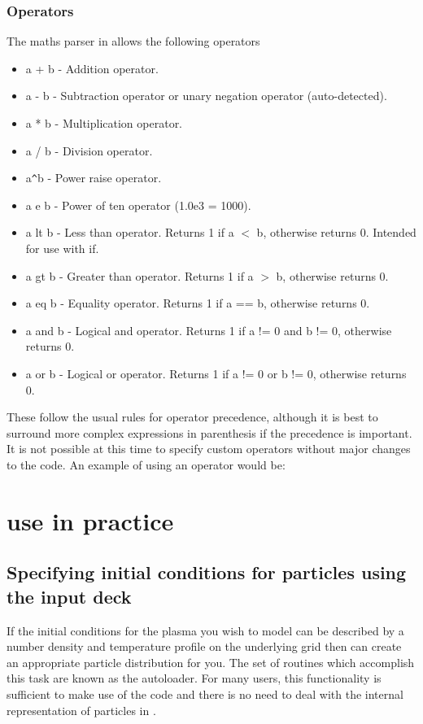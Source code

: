 \subsubsection{Operators}
The maths parser in {\EPOCH} allows the following operators
\begin{itemize}
\item a + b - Addition operator.
\item a - b - Subtraction operator or unary negation operator (auto-detected).
\item a * b - Multiplication operator.
\item a / b - Division operator.
\item a\verb|^|b - Power raise operator.
\item a e b - Power of ten operator (1.0e3 = 1000).
\item a lt b - Less than operator. Returns 1 if a $<$ b, otherwise returns
  0. Intended for use with if.
\item a gt b - Greater than operator. Returns 1 if a $>$ b, otherwise returns 0.
\item a eq b - Equality operator. Returns 1 if a == b, otherwise returns 0.
\item a and b - Logical and operator. Returns 1 if a != 0 and b != 0,
  otherwise returns 0.
\item a or b - Logical or operator. Returns 1 if a != 0 or b != 0, otherwise
  returns 0.
\end{itemize}

These follow the usual rules for operator precedence, although it is best
to surround more complex expressions in parenthesis if the precedence
is important.
It is not possible at this time to specify custom operators without major
changes to the code. An example of using an operator would be:\\
\indent{}


\section{{\EPOCH} use in practice}
\label{sec:usage}

\subsection{Specifying initial conditions for particles using the input deck}

If the initial conditions for the plasma you wish to model can be described
by a number density and temperature profile on the underlying grid then
{\EPOCH} can create an appropriate particle distribution for you. The
set of routines which accomplish this task are known as the autoloader.
For many users, this functionality is sufficient to make use of the
code and there is no need to deal with the internal representation of
particles in {\EPOCH}.

